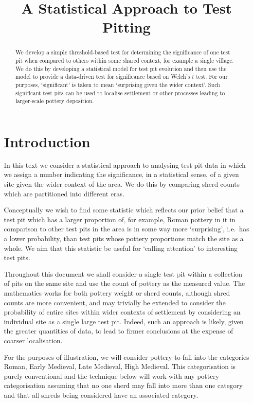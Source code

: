 \documentclass[conference]{IEEEtran}
\title{A Statistical Approach to Test Pitting}
\author{%
    \IEEEauthorblockN{Rich Wareham}
    \IEEEauthorblockA{Signal Processing and Communications Laboratory\\
    Department of Engineering, University of Cambridge\\
    Email: rjw57@cam.ac.uk}
}
\begin{document}
\maketitle

\begin{abstract}
    We develop a simple threshold-based test for determining the significance of
    one test pit when compared to others within some shared context, for example
    a single village. We do this by developing a statistical model for test pit
    evolution and then use the model to provide a data-driven test for
    significance based on Welch's $t$ test\cite{welch}. For our purposes,
    `significant' is taken to mean `surprising given the wider context'. Such
    significant test pits can be used to localise settlement or other processes
    leading to larger-scale pottery deposition.
\end{abstract}

\section{Introduction}

In this text we consider a statistical approach to analysing test pit data in
which we assign a number indicating the significance, in a statistical sense,
of a given site given the wider context of the area. We do this by comparing
sherd counts which are partitioned into different eras.

Conceptually we wish to find some statistic which reflects our prior belief that a
test pit which has a larger proportion of, for example, Roman pottery in it in
comparison to other test pits in the area is in some way more `surprising',
i.e.\ has a lower probability, than test pits whose pottery proportions match
the site as a whole. We aim that this statistic be useful for `calling
attention' to interesting test pits.

Throughout this document we shall consider a single test pit within a collection
of pits on the same site and use the count of pottery as the measured value.
The mathematics works for both pottery weight or sherd counts, although shred
counts are more convenient, and may trivially be extended to consider the
probability of entire sites within wider contexts of settlement by considering
an individual site as a single large test pit. Indeed, such an approach is
likely, given the greater quantities of data, to lead to firmer conclusions at
the expense of coarser localisation.

For the purposes of illustration, we will consider pottery to fall into the
categories Roman, Early Medieval, Late Medieval, High Medieval. This
categorisation is purely conventional and the technique below will work with any
pottery categorisation assuming that no one sherd may fall into more than one
category and that all shreds being considered have an associated category.
\end{document}
